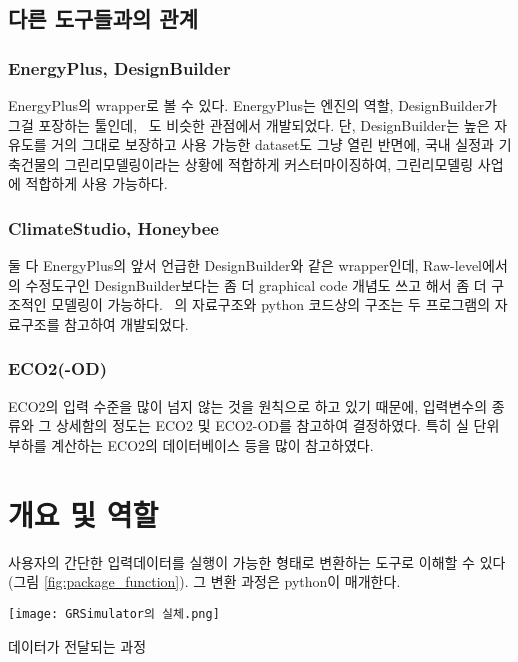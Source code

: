 \subsection{다른 도구들과의 관계}
\subsubsection{EnergyPlus, DesignBuilder}
\simulator\는 EnergyPlus의 wrapper로 볼 수 있다. EnergyPlus는 엔진의 역할, DesignBuilder가 그걸 포장하는 툴인데, \simulator~도 비슷한 관점에서 개발되었다. 단, DesignBuilder는 높은 자유도를 거의 그대로 보장하고 사용 가능한 dataset도 그냥 열린 반면에, \simulator\는 국내 실정과 기축건물의 그린리모델링이라는 상황에 적합하게 커스터마이징하여, 그린리모델링 사업에 적합하게 사용 가능하다.

\subsubsection{ClimateStudio, Honeybee}
둘 다 EnergyPlus의 앞서 언급한 DesignBuilder와 같은 wrapper인데, Raw-level에서의 수정도구인 DesignBuilder보다는 좀 더 graphical code 개념도 쓰고 해서 좀 더 구조적인 모델링이 가능하다. \simulator~의 자료구조와 python 코드상의 구조는 두 프로그램의 자료구조를 참고하여 개발되었다.

\subsubsection{ECO2(-OD)}
\simulator\는 ECO2의 입력 수준을 많이 넘지 않는 것을 원칙으로 하고 있기 때문에, 입력변수의 종류와 그 상세함의 정도는 ECO2 및 ECO2-OD를 참고하여 결정하였다. 특히 실 단위 부하를 계산하는 ECO2의 데이터베이스 등을 많이 참고하였다.


\section{ 개요 및 역할}

\simulator\는 사용자의 간단한 입력데이터를 \ep 실행이 가능한 형태로 변환하는 도구로 이해할 수 있다 (그림 \ref{fig:package_function}). 그 변환 과정은 python이 매개한다.

\begin{defaultfigure}
  \texttt{[image: GRSimulator의 실체.png]}
  \caption{ 데이터가 전달되는 과정}
  \label{fig:package_function}
\end{defaultfigure}
